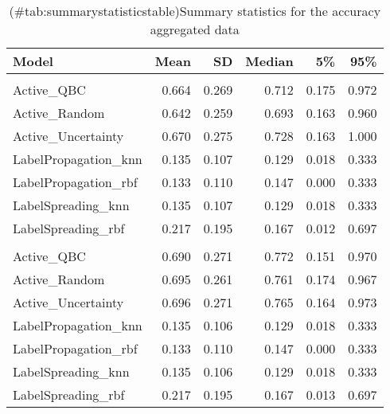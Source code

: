 \begin{table}[!h]

\caption{(\#tab:summarystatisticstable)Summary statistics for the accuracy aggregated data}
\centering
\begin{tabular}[t]{lrrrrr}
\toprule
Model & Mean & SD & Median & 5\% & 95\%\\
\midrule
\addlinespace[0.3em]
\multicolumn{6}{l}{\textbf{10\% labels available}}\\
\hspace{1em}Active\_QBC & 0.664 & 0.269 & 0.712 & 0.175 & 0.972\\
\hspace{1em}Active\_Random & 0.642 & 0.259 & 0.693 & 0.163 & 0.960\\
\hspace{1em}Active\_Uncertainty & 0.670 & 0.275 & 0.728 & 0.163 & 1.000\\
\hspace{1em}LabelPropagation\_knn & 0.135 & 0.107 & 0.129 & 0.018 & 0.333\\
\hspace{1em}LabelPropagation\_rbf & 0.133 & 0.110 & 0.147 & 0.000 & \vphantom{1}0.333\\
\hspace{1em}LabelSpreading\_knn & 0.135 & 0.107 & 0.129 & 0.018 & 0.333\\
\hspace{1em}LabelSpreading\_rbf & 0.217 & 0.195 & 0.167 & 0.012 & 0.697\\
\addlinespace[0.3em]
\multicolumn{6}{l}{\textbf{50\% labels available}}\\
\hspace{1em}Active\_QBC & 0.690 & 0.271 & 0.772 & 0.151 & 0.970\\
\hspace{1em}Active\_Random & 0.695 & 0.261 & 0.761 & 0.174 & 0.967\\
\hspace{1em}Active\_Uncertainty & 0.696 & 0.271 & 0.765 & 0.164 & 0.973\\
\hspace{1em}LabelPropagation\_knn & 0.135 & 0.106 & 0.129 & 0.018 & 0.333\\
\hspace{1em}LabelPropagation\_rbf & 0.133 & 0.110 & 0.147 & 0.000 & 0.333\\
\hspace{1em}LabelSpreading\_knn & 0.135 & 0.106 & 0.129 & 0.018 & 0.333\\
\hspace{1em}LabelSpreading\_rbf & 0.217 & 0.195 & 0.167 & 0.013 & 0.697\\
\bottomrule
\end{tabular}
\end{table}
